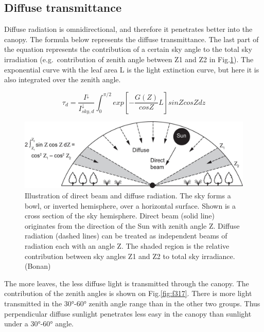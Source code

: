 \documentclass[12pt,oneside]{book}
\begin{document}
\subsection{Diffuse transmittance}\label{diffuse-transmittance}

Diffuse radiation is omnidirectional, and therefore it penetrates better
into the canopy. The formula below represents the diffuse transmittance.
The last part of the equation represents the contribution of a certain
sky angle to the total sky irradiation (e.g.~contribution of zenith
angle between Z1 and Z2 in Fig.\ref{fig:f316}). The exponential curve
with the leaf area L is the light extinction curve, but here it is also
integrated over the zenith angle.

\[
\tau_d = \frac{I^{\downarrow}}{I^{\downarrow}_{sky,d}} \int_0^{\pi/2} exp\left[- \frac{G(Z)}{cosZ}L \right] sinZcosZdz
\]

\begin{figure}

{\centering \includegraphics[width=0.8\linewidth]{figures/chap3/f316_diffuse} 

}

\caption{Illustration of direct beam and diffuse radiation. The sky forms a bowl, or inverted hemisphere, over a horizontal surface. Shown is a cross section of the sky hemisphere. Direct beam (solid line) originates from the    direction of the Sun with zenith angle Ζ. Diffuse radiation (dashed lines) can be treated as independent beams of radiation each with an angle Ζ. The shaded region is the relative contribution between sky angles Ζ1 and Ζ2 to total sky irradiance.(Bonan)}\label{fig:f316}
\end{figure}

The more leaves, the less diffuse light is transmitted through the
canopy. The contribution of the zenith angles is shown on
Fig.\ref{fig:f317}. There is more light transmitted in the 30°-60°
zenith angle range than in the other two groups. Thus perpendicular
diffuse sunlight penetrates less easy in the canopy than sunlight under
a 30°-60° angle.
\end{document}
